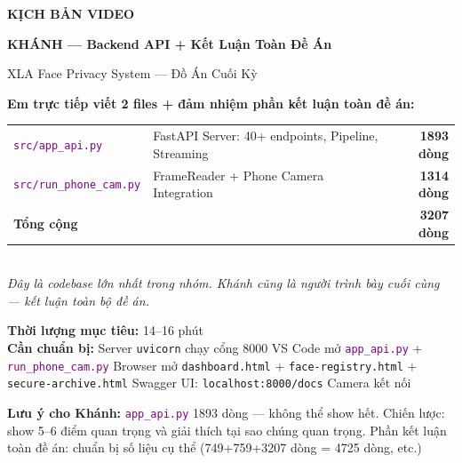 \documentclass[12pt, a4paper]{article}
\newcommand{\fpath}[1]{\texttt{\textcolor{purple}{#1}}}
\begin{document}

\begin{titlepage}
\centering\vspace*{1.5cm}
{\Huge\bfseries\color{MidnightBlue!80!black} KỊCH BẢN VIDEO\par}
\vspace{0.3cm}
{\LARGE\bfseries\color{MidnightBlue!70!black} KHÁNH --- Backend API + Kết Luận Toàn Đề Án\par}
\vspace{0.5cm}
{\large\color{gray} XLA Face Privacy System --- Đồ Án Cuối Kỳ\par}
\vspace{1.2cm}

\begin{tcolorbox}[colback=MidnightBlue!6, colframe=MidnightBlue!80, width=0.9\textwidth]
\centering\large
\textbf{Em trực tiếp viết 2 files + đảm nhiệm phần kết luận toàn đề án:}\\[0.4cm]
\renewcommand{\arraystretch}{1.5}
\begin{tabular}{llr}
  \hline
  \fpath{src/app\_api.py} & FastAPI Server: 40+ endpoints, Pipeline, Streaming & \textbf{1893 dòng} \\
  \fpath{src/run\_phone\_cam.py} & FrameReader + Phone Camera Integration & \textbf{1314 dòng} \\
  \hline
  \multicolumn{2}{l}{\textbf{Tổng cộng}} & \textbf{3207 dòng} \\
  \hline
\end{tabular}\\[0.4cm]
\textit{Đây là codebase lớn nhất trong nhóm.
Khánh cũng là người trình bày cuối cùng --- kết luận toàn bộ đề án.}
\end{tcolorbox}

\vspace{0.8cm}
\begin{tcolorbox}[colback=gray!6, colframe=gray!50, width=0.9\textwidth]
\textbf{Thời lượng mục tiêu:} 14--16 phút\\[0.2cm]
\textbf{Cần chuẩn bị:}
Server \texttt{uvicorn} chạy cổng 8000 \textbullet{}
VS Code mở \fpath{app\_api.py} + \fpath{run\_phone\_cam.py} \textbullet{}
Browser mở \texttt{dashboard.html} + \texttt{face-registry.html} + \texttt{secure-archive.html} \textbullet{}
Swagger UI: \texttt{localhost:8000/docs} \textbullet{}
Camera kết nối
\end{tcolorbox}

\vspace{0.8cm}
\begin{warn}
\textbf{Lưu ý cho Khánh:}
\fpath{app\_api.py} 1893 dòng --- không thể show hết. Chiến lược: show 5--6 điểm quan trọng và giải thích tại sao chúng quan trọng.
Phần kết luận toàn đề án: chuẩn bị số liệu cụ thể (749+759+3207 dòng = 4725 dòng, etc.)
\end{warn}

\end{titlepage}
\end{document}

